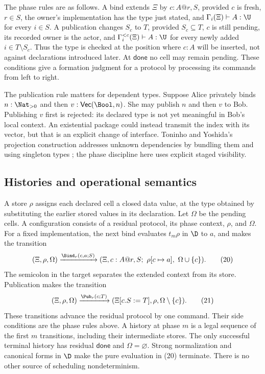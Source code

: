 The phase rules are as follows.
A bind extends $\Xi$ by $c:A@r,S$, provided $c$ is fresh, $r\in S$,
the owner's implementation has the type just stated, and
$\Gamma_i(\Xi)\vdash A:\U$ for every $i\in S$.
A publication changes $S_c$ to $T$, provided $S_c\subseteq T$,
$c$ is still pending, its recorded owner is the actor, and
$\Gamma_i^{<c}(\Xi)\vdash A:\U$ for every newly added
$i\in T\setminus S_c$.
Thus the type is checked at the position where $c:A$ will be inserted,
not against declarations introduced later.
At $\mathsf{done}$ no cell may remain pending.
These conditions give a formation judgment for a protocol by processing
its commands from left to right.

The publication rule matters for dependent types. Suppose Alice privately
binds $n:\Nat_{>0}$ and then $v:\mathsf{Vec}(\Bool,n)$. She may publish $n$
and then $v$ to Bob. Publishing $v$ first is rejected: its declared type is
not yet meaningful in Bob's local context. An existential package could
instead transmit the index with its vector, but that is an explicit change
of interface. Toninho and Yoshida's projection construction addresses
unknown dependencies by bundling them and using singleton types
\cite{ToninhoYoshida2017}; the phase discipline here uses explicit staged
visibility.

\subsection{Histories and operational semantics}

A store $\rho$ assigns each declared cell a closed data value, at the type
obtained by substituting the earlier stored values in its declaration.
Let $\Omega$ be the pending cells. A configuration consists of a residual
protocol, its phase context, $\rho$, and $\Omega$.
For a fixed implementation, the next bind evaluates $t_m\rho$ in $\D$
to $a$, and makes the transition
\[
 (\Xi,\rho,\Omega)
 \xrightarrow{\Bind_r(c,a;S)}
 (\Xi,c:A@r,S;\ \rho[c\mapsto a],\ \Omega\cup\{c\}).
 \tag{20}
\]
The semicolon in the target separates the extended context from its store.
Publication makes the transition
\[
 (\Xi,\rho,\Omega)
 \xrightarrow{\Pub_r(c;T)}
 (\Xi[c.S:=T],\rho,\Omega\setminus\{c\}).
 \tag{21}
\]
These transitions advance the residual protocol by one command. Their side
conditions are the phase rules above. A history at phase $m$ is a legal
sequence of the first $m$ transitions, including their intermediate stores.
The only successful terminal history has residual $\mathsf{done}$ and
$\Omega=\varnothing$.
Strong normalization and canonical forms in $\D$ make the pure evaluation
in (20) terminate. There is no other source of scheduling nondeterminism.

